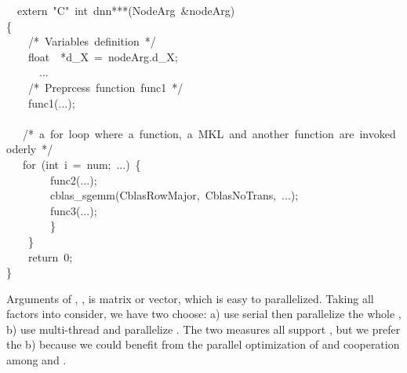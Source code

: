 \documentclass{article}
\begin{document}
\begin{mdpre}%
\noindent~~extern~{"}{C}{"}~{int}~dnn***({NodeArg}~\&nodeArg)\\
\{\\
~~~~{/*}{~Variables~definition~}{*/}\\
~~~~{float}~~*d\_X~=~nodeArg.d\_X;\\
~~~~~~...\\
~~~~{/*}{~Preprcess~function~func1~}{*/}\\
~~~~func1(...);\\
\\
~~~{/*}{~a~for~loop~where~a~function,~a~MKL~and~another~function~are~invoked~oderly~}{*/}\\
~~~{for}~({int}~i~=~num;~...)~\{\\
~~~~~~~~func2(...);\\
~~~~~~~~cblas\_sgemm({CblasRowMajor},~{CblasNoTrans},~...);\\
~~~~~~~~func3(...);\\
~~~~~~~~\}\\
~~~~\}~\\
~~~~{return}~{0};\\
\}\\
\end{mdpre}\noindent{}Arguments of , ,  is matrix or vector, which is easy to parallelized. Taking all factors into consider, we have two choose: a) use serial  then parallelize the whole , b) use multi-thread  and parallelize . The two measures all support , but we prefer the b) because we could benefit from the parallel optimization of  and cooperation among  and .
\end{document}
